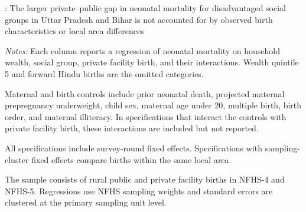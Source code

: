 \documentclass[12pt]{article}
\begin{document}
\clearpage



\begin{landscape}

\renewcommand{\arraystretch}{0.7}
\setlength{\tabcolsep}{12pt}

\begin{table}[H]
    \centering

    \caption{
        : The larger private--public gap in neonatal mortality for
        disadvantaged social groups in Uttar Pradesh and Bihar is not
        accounted for by observed birth characteristics or local area
        differences
    }
    \label{tab:nnm_interactions}

    \vspace{0.4em}

    \begin{threeparttable}

        \begin{adjustbox}{max width=\textwidth}
            \scriptsize
            
        \end{adjustbox}

        \vspace{0.5em}

        \begin{minipage}{0.92\textwidth}
            \scriptsize
            \textit{Notes:}
            Each column reports a regression of neonatal mortality on
            household wealth, social group, private facility birth, and their
            interactions. Wealth quintile 5 and forward Hindu births are the
            omitted categories.

            Maternal and birth controls include prior neonatal death,
            projected maternal prepregnancy underweight, child sex, maternal
            age under 20, multiple birth, birth order, and maternal
            illiteracy. In specifications that interact the controls with
            private facility birth, these interactions are included but not
            reported.

            All specifications include survey-round fixed effects.
            Specifications with sampling-cluster fixed effects compare births
            within the same local area.

            The sample consists of rural public and private facility births
            in NFHS-4 and NFHS-5. Regressions use NFHS sampling weights and
            standard errors are clustered at the primary sampling unit level.


\end{minipage}
\end{threeparttable}
\end{table}
\end{landscape}
\end{document}
